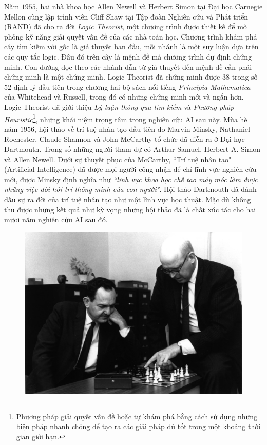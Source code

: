 \begin{multicols}{2}
	Năm $1955$, hai nhà khoa học Allen Newell và Herbert Simon tại Đại học Carnegie Mellon cùng lập trình viên Cliff Shaw tại Tập đoàn Nghiên cứu và Phát triển (RAND) đã cho ra đời \textit{Logic Theorist}, một chương trình được thiết kế để mô phỏng kỹ năng giải quyết vấn đề của các nhà toán học. Chương trình khám phá cây tìm kiếm với gốc là giả thuyết ban đầu, mỗi nhánh là một suy luận dựa trên các quy tắc logic. Đâu đó trên cây là mệnh đề mà chương trình dự định chứng minh. Con đường dọc theo các nhánh dẫn từ giả thuyết đến mệnh đề cần phải chứng minh là một chứng minh. Logic Theorist đã chứng minh được $38$ trong số $52$ định lý đầu tiên trong chương hai bộ sách nổi tiếng \textit{Principia Mathematica} của Whitehead và Russell, trong đó có những chứng minh mới và ngắn hơn. Logic Theorist đã giới thiệu \textit{Lý luận thông qua tìm kiếm} và \textit{Phương pháp Heuristic}\footnote{\color{timhieukhoahoc}Phương pháp giải quyết vấn đề hoặc tự khám phá bằng cách sử dụng những biện pháp nhanh chóng để tạo ra các giải pháp đủ tốt trong một khoảng thời gian giới hạn.}, những khái niệm trọng tâm trong nghiên cứu AI sau này.
	\vskip 0.1cm
	Mùa hè năm $1956$, hội thảo về trí tuệ nhân tạo đầu tiên do Marvin Minsky, Nathaniel Rochester, Claude Shannon và John McCarthy tổ chức đã diễn ra ở Đại học Dartmouth. Trong số những người tham dự có Arthur Samuel, Herbert A. Simon và Allen Newell. Dưới sự thuyết phục của McCarthy, ``Trí tuệ nhân tạo" (Artificial Intelligence) đã được mọi người công nhận để chỉ lĩnh vực nghiên cứu mới, được Minsky định nghĩa như \textit{``lĩnh vực khoa học chế tạo máy móc làm được những việc đòi hỏi trí thông minh của con người"}. Hội thảo Dartmouth đã đánh dấu sự ra đời của trí tuệ nhân tạo như một lĩnh vực học thuật. Mặc dù không thu được những kết quả như kỳ vọng nhưng hội thảo đã là chất xúc tác cho hai mươi năm nghiên cứu AI sau đó.
	\begin{figure}[H]
		\vspace*{-5pt}
		\centering
		\captionsetup{labelformat= empty, justification=centering}
		\includegraphics[width= 1\linewidth]{Newell_Simon.jpeg}

\end{figure}
\end{multicols}
